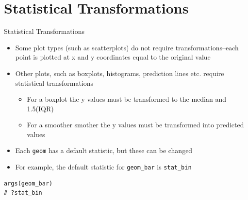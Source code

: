 \documentclass[table,smaller]{beamer}
\begin{document}
\section{Statistical Transformations}
\label{sec-3}

\begin{frame}[fragile,label=sec-3-1]{Statistical Transformations}
 \begin{itemize}
\item Some plot types (such as scatterplots) do not require transformations--each point is plotted at x and y coordinates equal to the original value
\item Other plots, such as boxplots, histograms, prediction lines etc. require statistical transformations
\begin{itemize}
\item For a boxplot the y values must be transformed to the median and 1.5(IQR)
\item For a smoother smother the y values must be transformed into predicted values
\end{itemize}
\item Each \texttt{geom} has a default statistic, but these can be changed
\item For example, the default statistic for \texttt{geom\_bar} is \texttt{stat\_bin}
\end{itemize}
\begin{verbatim}
args(geom_bar)
# ?stat_bin
\end{verbatim}
\end{frame}
\end{document}
